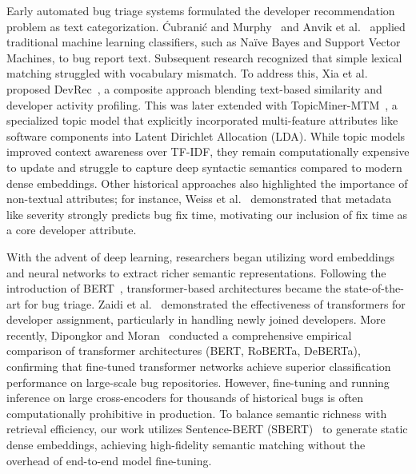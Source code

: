 \documentclass[sigconf,review,anonymous]{acmart}
\begin{document}
Early automated bug triage systems formulated the developer recommendation problem as text categorization. \'{C}ubrani\'{c} and Murphy~\cite{cubranic2004hipikat} and Anvik et al.~\cite{anvik2006triage} applied traditional machine learning classifiers, such as Na\"{i}ve Bayes and Support Vector Machines, to bug report text. Subsequent research recognized that simple lexical matching struggled with vocabulary mismatch. To address this, Xia et al. proposed DevRec~\cite{xia2013devsim}, a composite approach blending text-based similarity and developer activity profiling. This was later extended with TopicMiner-MTM~\cite{xia2017topicminer}, a specialized topic model that explicitly incorporated multi-feature attributes like software components into Latent Dirichlet Allocation (LDA). While topic models improved context awareness over TF-IDF, they remain computationally expensive to update and struggle to capture deep syntactic semantics compared to modern dense embeddings. Other historical approaches also highlighted the importance of non-textual attributes; for instance, Weiss et al.~\cite{weiss2007msr} demonstrated that metadata like severity strongly predicts bug fix time, motivating our inclusion of fix time as a core developer attribute.

With the advent of deep learning, researchers began utilizing word embeddings and neural networks to extract richer semantic representations. Following the introduction of BERT~\cite{devlin2019bert}, transformer-based architectures became the state-of-the-art for bug triage. Zaidi et al.~\cite{zaidi2022transformers} demonstrated the effectiveness of transformers for developer assignment, particularly in handling newly joined developers. More recently, Dipongkor and Moran~\cite{dipongkor2023transformer} conducted a comprehensive empirical comparison of transformer architectures (BERT, RoBERTa, DeBERTa), confirming that fine-tuned transformer networks achieve superior classification performance on large-scale bug repositories. However, fine-tuning and running inference on large cross-encoders for thousands of historical bugs is often computationally prohibitive in production. To balance semantic richness with retrieval efficiency, our work utilizes Sentence-BERT (SBERT)~\cite{reimers2019sentencetransformers} to generate static dense embeddings, achieving high-fidelity semantic matching without the overhead of end-to-end model fine-tuning.
\end{document}
